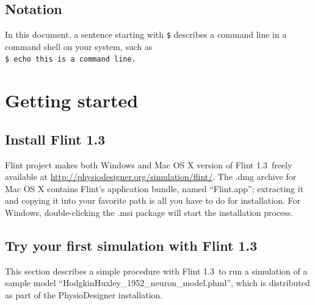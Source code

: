 \documentclass[a4paper,10pt]{report}
\def\FlintVersion{1.3}
\def\Flint{Flint \FlintVersion}
\begin{document}
\section{Notation}
In this document, a sentence starting with {\tt \$} describes a command line in
a command shell on your system, such as\\
{\tt \$ echo this is a command line.}



\chapter{Getting started}

\section{Install \Flint}
Flint project makes both Windows and Mac OS X version of \Flint\ freely
available at \url{http://physiodesigner.org/simulation/flint/}.
The .dmg archive for Mac OS X contains Flint's application bundle, named
``Flint.app''; extracting it and copying it into your favorite path is all
you have to do for installation.
For Windows, double-clicking the .msi package will start the installation
process.

\section{Try your first simulation with \Flint}
This section describes a simple procedure with \Flint\ to run a simulation of a
sample model ``HodgkinHuxley\_1952\_neuron\_model.phml'', which is distributed
as part of the PhysioDesigner installation.
\end{document}
